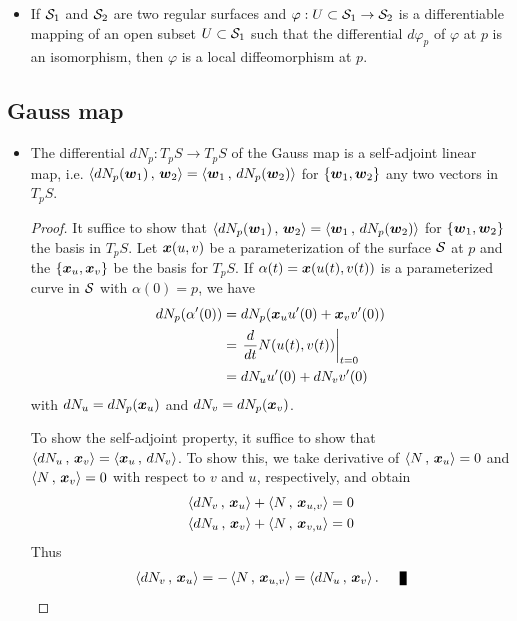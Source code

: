 \documentclass[11pt]{article}
\begin{document}
\begin{itemize}
\item \begin{theorem}\label{th: inver_fun}
If ${\mathcal S}_{1}$ and ${\mathcal S}_{2}$ are two regular surfaces and $\varphi: U\subset {\mathcal S}_{1} \rightarrow {\mathcal S}_{2}$ is a differentiable mapping of an open subset $U\subset {\mathcal S}_{1}$ such that the differential $d\varphi_{p}$ of $\varphi$ at $p$ is an isomorphism, then $\varphi$ is a local diffeomorphism at $p$.
\end{theorem}\vspace{10pt}
\end{itemize}

\subsection{Gauss map}
\begin{itemize}
\item \begin{proposition}\label{prop: Gauss_selfadj}
The differential $dN_{p}:  T_{p}S \rightarrow T_{p}S$ of the Gauss map is a self-adjoint linear map, i.e. $\left\langle dN_{p}(\boldsymbol{w}_{1})\,,\, \boldsymbol{w}_{2} \right\rangle = \left\langle \boldsymbol{w}_{1}\,,\, dN_{p}(\boldsymbol{w}_{2}) \right\rangle  $ for $\left\{\boldsymbol{w}_{1}, \boldsymbol{w}_{2}\right\}$ any two vectors in $T_{p}S$. 
\end{proposition}
\begin{proof}
It suffice to show that $\left\langle dN_{p}(\boldsymbol{w}_{1})\,,\, \boldsymbol{w}_{2} \right\rangle = \left\langle \boldsymbol{w}_{1}\,,\, dN_{p}(\boldsymbol{w}_{2}) \right\rangle  $ for $\left\{\boldsymbol{w}_{1}, \boldsymbol{w}_{2}\right\}$ the basis in $T_{p}S$. Let $\boldsymbol{x}(u,v)$ be a parameterization of the surface ${\mathcal S}$ at $p$ and the $\left\{\boldsymbol{x}_{u}, \boldsymbol{x}_{v}\right\}$ be the basis for $T_{p}S$. If $\alpha(t) = \boldsymbol{x}(u(t), v(t))$ is a parameterized curve in ${\mathcal S}$ with $\alpha(0) = p$, we have 
\begin{align*}
dN_{p}(\alpha'(0)) &= dN_{p}( \boldsymbol{x}_{u}u'(0) + \boldsymbol{x}_{v}v'(0) )\\
&= \left.{\frac{d}{dt}N(u(t), v(t) )}\right\vert_{t=0}\\
&= dN_{u}u'(0) + dN_{v}v'(0)
\end{align*} with $dN_{u} = dN_{p}( \boldsymbol{x}_{u})$ and  $dN_{v} = dN_{p}( \boldsymbol{x}_{v})$.

To show the self-adjoint property, it suffice to show that $\left\langle dN_{u}\,,\, \boldsymbol{x}_{v} \right\rangle = \left\langle \boldsymbol{x}_{u}\,,\, dN_{v} \right\rangle$. To show this, we take derivative of $\left\langle N\,,\, \boldsymbol{x}_{u} \right\rangle = 0$ and $\left\langle N\,,\, \boldsymbol{x}_{v} \right\rangle = 0$ with respect to $v$ and $u$, respectively, and obtain
\begin{align*}
\left\langle dN_{v}\,,\, \boldsymbol{x}_{u} \right\rangle  + \left\langle N\,,\, \boldsymbol{x}_{u,v} \right\rangle = 0\\
\left\langle dN_{u}\,,\, \boldsymbol{x}_{v} \right\rangle  + \left\langle N\,,\, \boldsymbol{x}_{v,u} \right\rangle = 0
\end{align*}
Thus
\begin{align*}
\inn{dN_{v}}{\mb{x}_{u}}  = -  \inn{N}{\mb{x}_{u,v}}  = \inn{dN_{u}}{\mb{x}_{v}}.   \qed
\end{align*}
\end{proof}


\end{itemize}
\end{document}
